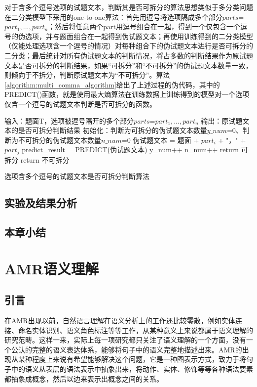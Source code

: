 \documentclass[master, winfont]{njuthesis}
\begin{document}
对于含多个逗号选项的试题文本，判断其是否可拆分的算法思想类似于多分类问题在二分类模型下采用的one-to-one算法：首先用逗号将选项隔成多个部分$parts$=${part_1, ..., part_n}$；然后将任意两个part用逗号组合在一起，得到一个仅包含一个逗号的伪选项，并与题面组合在一起得到伪试题文本；再使用训练得到的二分类模型（仅能处理选项含一个逗号的情况）对每种组合下的伪试题文本进行是否可拆分的二分类；最后统计对所有伪试题文本的判断情况，将占多数的判断结果作为原试题文本是否可拆分的判断结果，如果“可拆分”和“不可拆分”的伪试题文本数量一致，则倾向于不拆分，判断原试题文本为“不可拆分”。算法\ref{algorithm:multi_comma_algorithm}给出了上述过程的伪代码，其中的PREDICT()函数，就是使用最大熵算法在训练数据上训练得到的模型对一个选项仅含一个逗号的试题文本判断是否可拆分的函数。

\begin{algorithm}
\begin{algorithmic}[1]
\STATE 输入：题面T，选项被逗号隔开的多个部分$parts$=${part_1, ..., part_n}$
\STATE 输出：原试题文本的是否可拆分判断结果
\STATE 初始化：判断为可拆分的伪试题文本数量$y\_num$=0、判断为不可拆分的伪试题文本数量$n\_num$=0
		\STATE 伪试题文本 = 题面 + $part_i$ + "，" + $part_j$
		\STATE predict\_result = PREDICT(伪试题文本)
			\STATE y\_num++
		\ELSE
			\STATE n\_num++
		\ENDIF
	\ENDFOR
\ENDFOR
{}
	\STATE return 可拆分
\ELSE
	\STATE return 不可拆分
\ENDIF
\end{algorithmic}
\caption{\label{algorithm:multi_comma_algorithm}选项含多个逗号的试题文本是否可拆分判断算法}
\end{algorithm}

\section{实验及结果分析}
 
\section{本章小结}

\chapter{AMR语义理解}
\label{chapter:amr}
\section{引言}
在AMR出现以前，自然语言理解在语义分析上的工作还比较零散，例如实体连接、命名实体识别、语义角色标注等等工作，从某种意义上来说都属于语义理解的研究范畴。这样一来，实际上每一项研究都只关注了语义理解的一个方面，没有一个公认的完整的语义表达体系，能够将句子中的语义完整地描述出来。AMR的出现从某种程度上来说有希望能够解决这个问题，它是一种图表示方式，致力于将句子中的语义从表层的语法表示中抽象出来，将动作、实体、修饰等等各种语法要素都抽象成概念，然后以边来表示出概念之间的关系。
\end{document}
